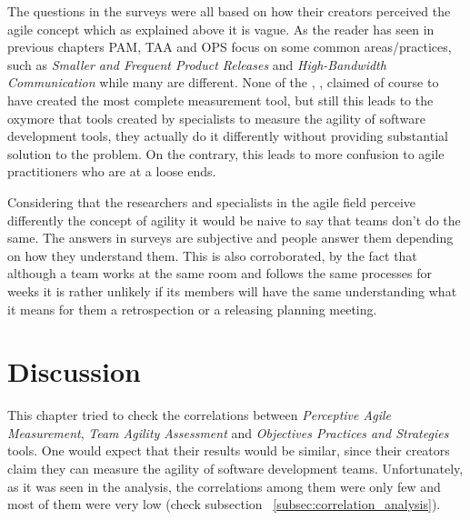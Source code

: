 The questions in the surveys were all based on how their creators perceived the agile concept which as explained above it is vague. As the reader has seen in previous chapters PAM, TAA and OPS focus on some common areas/practices, such as  \textit{Smaller and Frequent Product Releases} and \textit{High-Bandwidth Communication} while many are different. None of the \citet{sventha_dissertation}, \citet{pam}, \citet{Leffingwell} claimed of course to have created the most complete measurement tool, but still this leads to the oxymore that tools created by specialists to measure the agility of software development tools, they actually do it differently without providing substantial solution to the problem. On the contrary, this leads to more confusion to agile practitioners who are at a loose ends.

Considering that the researchers and specialists in the agile field perceive differently the concept of agility it would be naive to say that teams don’t do the same. The answers in surveys are subjective and people answer them depending on how they understand them. This is also corroborated, by the fact that although a team works at the same room and follows the same processes for weeks it is rather unlikely if its members will have the same understanding what it means for them a retrospection or a releasing planning meeting.

\section{Discussion}
This chapter tried to check the correlations between \textit{Perceptive Agile Measurement}, \textit{Team Agility Assessment} and \textit{Objectives Practices and Strategies} tools. One would expect that their results would be similar, since their creators claim they can measure the agility of software development teams. Unfortunately, as it was seen in the analysis, the correlations among them were only few and most of them were very low (check subsection ~\ref{subsec:correlation_analysis}).



